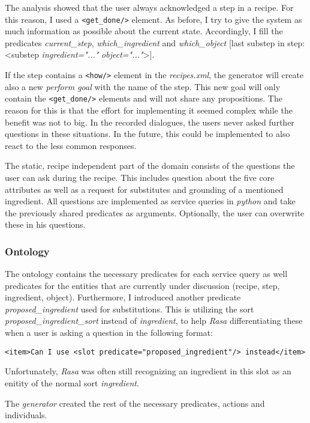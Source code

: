 \documentclass[
	11pt, %
]{fphw}
\begin{document}
The analysis showed that the user always acknowledged a step in a recipe. For this reason, I used a \texttt{<get_done/>} element. As before, I try to give the system as much information as possible about the current state. Accordingly, I fill the predicates \emph{current\_step}, \emph{which\_ingredient} and \emph{which\_object} [last substep in step: <substep \emph{ingredient="..."} \emph{object="..."}>].

If the step contains a \texttt{<how/>} element in the \emph{recipes.xml}, the generator will create also a new \emph{perform goal} with the name of the step. This new goal will only contain the \texttt{<get_done/>} elements and will not share any propositions. The reason for this is that the effort for implementing it seemed complex while the benefit was not to big. In the recorded dialogues, the users never asked further questions in these situations. In the future, this could be implemented to also react to the less common responses.

The static, recipe independent part of the domain consists of the questions the user can ask during the recipe. This includes question about the five core attributes as well as a request for substitutes and grounding of a mentioned ingredient. All questions are implemented as service queries in \emph{python} and take the previously shared predicates as arguments. Optionally, the user can overwrite these in his questions. 

\subsubsection*{Ontology}
The ontology contains the necessary predicates for each service query as well predicates for the entities that are currently under discussion (recipe, step, ingredient, object). Furthermore, I introduced another predicate \emph{proposed\_ingredient} used for substitutions. This is utilizing the sort \emph{proposed\_ingredient\_sort} instead of \emph{ingredient}, to help \emph{Rasa} differentiating these when a user is asking a question in the following format:
\begin{center}
\texttt{<item>Can I use <slot predicate="proposed_ingredient"/> instead</item>}
\end{center}
Unfortunately, \emph{Rasa} was often still recognizing an ingredient in this slot as an enitity of the normal sort \emph{ingredient}. 

The \emph{generator} created the rest of the necessary predicates, actions and individuals.
\end{document}
